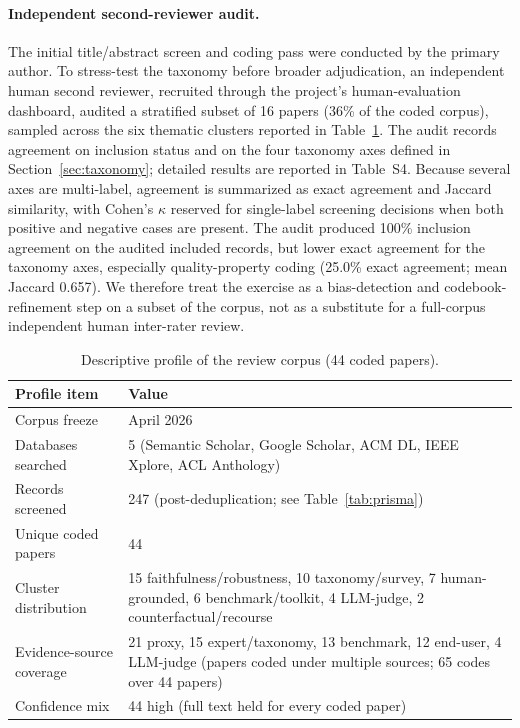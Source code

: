 \documentclass[fleqn,10pt,lineno]{wlpeerj}
\begin{document}
\paragraph{Independent second-reviewer audit.}
The initial title/abstract screen and coding pass were conducted by the
primary author. To stress-test the taxonomy before broader adjudication, an
independent human second reviewer, recruited through the project's
human-evaluation dashboard, audited a stratified subset of 16 papers
(36\% of the coded corpus), sampled across the six thematic clusters
reported in Table~\ref{tab:corpus_profile}. The audit records
agreement on inclusion status and on the four taxonomy axes defined in
Section~\ref{sec:taxonomy}; detailed results are reported in
Table~S4. Because several axes are multi-label, agreement
is summarized as exact agreement and Jaccard similarity, with Cohen's
$\kappa$ reserved for single-label screening decisions when both positive
and negative cases are present. The audit produced 100\% inclusion
agreement on the audited included records, but lower exact agreement for
the taxonomy axes, especially quality-property coding (25.0\% exact
agreement; mean Jaccard 0.657). We therefore treat the exercise as a
bias-detection and codebook-refinement step on a subset of the corpus, not
as a substitute for a full-corpus independent human inter-rater review.

\begin{table}[t]
\centering
\caption{Descriptive profile of the review corpus (44 coded papers).}
\begin{tabularx}{\linewidth}{l X}
\toprule
\textbf{Profile item} & \textbf{Value} \\
\midrule
Corpus freeze & April 2026 \\
Databases searched & 5 (Semantic Scholar, Google Scholar, ACM DL, IEEE Xplore, ACL Anthology) \\
Records screened & 247 (post-deduplication; see Table~\ref{tab:prisma}) \\
Unique coded papers & 44 \\
Cluster distribution & 15 faithfulness/robustness, 10 taxonomy/survey, 7 human-grounded, 6 benchmark/toolkit, 4 LLM-judge, 2 counterfactual/recourse \\
Evidence-source coverage & 21 proxy, 15 expert/taxonomy, 13 benchmark, 12 end-user, 4 LLM-judge (papers coded under multiple sources; 65 codes over 44 papers) \\
Confidence mix & 44 high (full text held for every coded paper) \\
\bottomrule
\end{tabularx}
\label{tab:corpus_profile}
\end{table}
\end{document}
